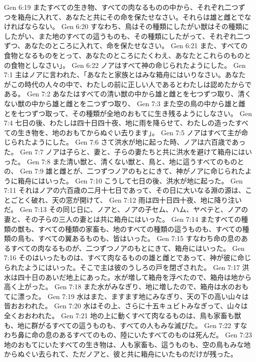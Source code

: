Gen 6:19  またすべての生き物、すべての肉なるものの中から、それぞれ二つずつを箱舟に入れて、あなたと共にその命を保たせなさい。それらは雄と雌とでなければならない。
Gen 6:20  すなわち、鳥はその種類にしたがい獣はその種類にしたがい、また地のすべての這うものも、その種類にしたがって、それぞれ二つずつ、あなたのところに入れて、命を保たせなさい。
Gen 6:21  また、すべての食物となるものをとって、あなたのところにたくわえ、あなたとこれらのものとの食物としなさい」。
Gen 6:22  ノアはすべて神の命じられたようにした。
Gen 7:1  主はノアに言われた、「あなたと家族とはみな箱舟にはいりなさい。あなたがこの時代の人々の中で、わたしの前に正しい人であるとわたしは認めたからである。
Gen 7:2  あなたはすべての清い獣の中から雄と雌とを七つずつ取り、清くない獣の中から雄と雌とを二つずつ取り、
Gen 7:3  また空の鳥の中から雄と雌とを七つずつ取って、その種類が全地のおもてに生き残るようにしなさい。
Gen 7:4  七日の後、わたしは四十日四十夜、地に雨を降らせて、わたしの造ったすべての生き物を、地のおもてからぬぐい去ります」。
Gen 7:5  ノアはすべて主が命じられたようにした。
Gen 7:6  さて洪水が地に起った時、ノアは六百歳であった。
Gen 7:7  ノアは子らと、妻と、子らの妻たちと共に洪水を避けて箱舟にはいった。
Gen 7:8  また清い獣と、清くない獣と、鳥と、地に這うすべてのものとの、
Gen 7:9  雄と雌とが、二つずつノアのもとにきて、神がノアに命じられたように箱舟にはいった。
Gen 7:10  こうして七日の後、洪水が地に起った。
Gen 7:11  それはノアの六百歳の二月十七日であって、その日に大いなる淵の源は、ことごとく破れ、天の窓が開けて、
Gen 7:12  雨は四十日四十夜、地に降り注いだ。
Gen 7:13  その同じ日に、ノアと、ノアの子セム、ハム、ヤペテと、ノアの妻と、その子らの三人の妻とは共に箱舟にはいった。
Gen 7:14  またすべての種類の獣も、すべての種類の家畜も、地のすべての種類の這うものも、すべての種類の鳥も、すべての翼あるものも、皆はいった。
Gen 7:15  すなわち命の息のあるすべての肉なるものが、二つずつノアのもとにきて、箱舟にはいった。
Gen 7:16  そのはいったものは、すべて肉なるものの雄と雌とであって、神が彼に命じられたようにはいった。そこで主は彼のうしろの戸を閉ざされた。
Gen 7:17  洪水は四十日のあいだ地上にあった。水が増して箱舟を浮べたので、箱舟は地から高く上がった。
Gen 7:18  また水がみなぎり、地に増したので、箱舟は水のおもてに漂った。
Gen 7:19  水はまた、ますます地にみなぎり、天の下の高い山々は皆おおわれた。
Gen 7:20  水はその上、さらに十五キュビトみなぎって、山々は全くおおわれた。
Gen 7:21  地の上に動くすべて肉なるものは、鳥も家畜も獣も、地に群がるすべての這うものも、すべての人もみな滅びた。
Gen 7:22  すなわち鼻に命の息のあるすべてのもの、陸にいたすべてのものは死んだ。
Gen 7:23  地のおもてにいたすべての生き物は、人も家畜も、這うものも、空の鳥もみな地からぬぐい去られて、ただノアと、彼と共に箱舟にいたものだけが残った。
